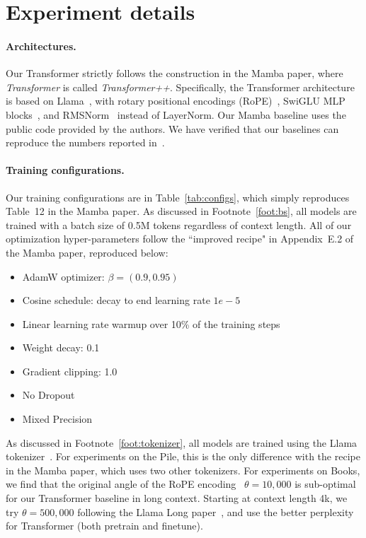 \documentclass{article}
\begin{document}
\section{Experiment details}
\label{app:details}
\paragraph{Architectures.}
Our Transformer strictly follows the construction in the Mamba paper, where \emph{Transformer} is called \emph{Transformer++}.
Specifically, the Transformer architecture is based on Llama~\cite{touvron2023llama}, with rotary positional encodings (RoPE)~\cite{su2023roformer}, SwiGLU MLP blocks~\cite{shazeer2020glu}, and RMSNorm~\cite{zhang2019root} instead of LayerNorm.
Our Mamba baseline uses the public code provided by the authors.
We have verified that our baselines can reproduce the numbers reported in~\cite{gu2023mamba}.

\paragraph{Training configurations.}
Our training configurations are in Table~\ref{tab:configs}, which simply reproduces Table~12 in the Mamba paper.
As discussed in Footnote~\ref{foot:bs}, all models are trained with a batch size of 0.5M tokens regardless of context length.
All of our optimization hyper-parameters follow the ``improved recipe" in Appendix~E.2 of the Mamba paper, reproduced below:
\begin{itemize}
\item AdamW optimizer: $\beta = (0.9, 0.95)$
\item Cosine schedule: decay to end learning rate \(1e-5\)
\item Linear learning rate warmup over 10\% of the training steps
\item Weight decay: 0.1
\item Gradient clipping: 1.0
\item No Dropout
\item Mixed Precision
\end{itemize}
As discussed in Footnote~\ref{foot:tokenizer}, all models are trained using the Llama tokenizer~\cite{touvron2023llama}. 
For experiments on the Pile, this is the only difference with the recipe in the Mamba paper, which uses two other tokenizers.
For experiments on Books, we find that the original angle of the RoPE encoding~\cite{su2023roformer} $\theta=10,000$ is sub-optimal for our Transformer baseline in long context.
Starting at context length 4k, we try $\theta=500,000$ following the Llama Long paper~\cite{xiong2023effective}, and use the better perplexity for Transformer (both pretrain and finetune).
\end{document}
